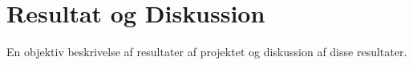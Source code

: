 \chapter{Resultat og Diskussion}\label{ch:Resultat og Diskussion}
En objektiv beskrivelse af resultater af projektet og diskussion af disse resultater.
